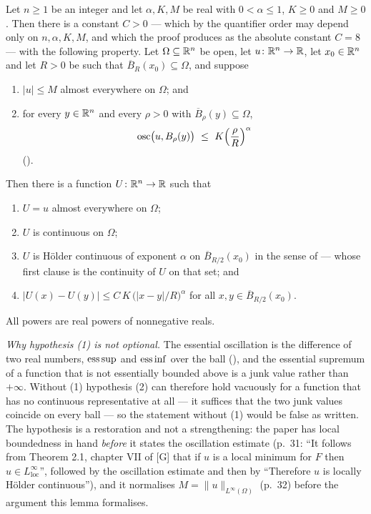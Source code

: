 \begin{lemma}
Let $n\ge1$ be an integer and let $\alpha,K,M$ be real with
$0<\alpha\le1$, $K\ge0$ and $M\ge0$.  Then there is a constant $C>0$ --- which
by the quantifier order may depend only on $n,\alpha,K,M$, and which the proof
produces as the absolute constant $C=8$ --- with the following property.  Let
$\Omega\subseteq\mathbb{R}^n$ be open, let $u\colon\mathbb{R}^n\to\mathbb{R}$, let $x_0\in\mathbb{R}^n$ and let
$R>0$ be such that $\overline B_R(x_0)\subseteq\Omega$, and suppose
\begin{enumerate}
\item $|u|\le M$ almost everywhere on $\Omega$; and
\item for every $y\in\mathbb{R}^n$ and every $\rho>0$ with
  $\overline B_\rho(y)\subseteq\Omega$,
  \[
  \operatorname*{osc}\bigl(u,B_\rho(y)\bigr)\ \le\ K\Bigl(\frac\rho R\Bigr)^{\alpha}
  \]
  ().
\end{enumerate}
Then there is a function $U\colon\mathbb{R}^n\to\mathbb{R}$ such that
\begin{enumerate}
\item[(a)] $U=u$ almost everywhere on $\Omega$;
\item[(b)] $U$ is continuous on $\Omega$;
\item[(c)] $U$ is H\"older continuous of exponent $\alpha$ on
  $\overline B_{R/2}(x_0)$ in the sense of  --- whose first
  clause is the continuity of $U$ on that set; and
\item[(d)] $|U(x)-U(y)|\le C\,K\,\bigl(|x-y|/R\bigr)^{\alpha}$ for all
  $x,y\in\overline B_{R/2}(x_0)$.
\end{enumerate}
All powers are real powers of nonnegative reals.

\medskip
\emph{Why hypothesis (1) is not optional.}  The essential oscillation is the
difference of two real numbers, $\operatorname*{ess\,sup}$ and
$\operatorname*{ess\,inf}$ over the ball (), and the essential
supremum of a function that is not essentially bounded above is a junk value
rather than $+\infty$.  Without (1) hypothesis (2) can therefore hold vacuously
for a function that has no continuous representative at all --- it suffices that
the two junk values coincide on every ball --- so the statement without (1)
would be false as written.  The hypothesis is a restoration and not a
strengthening: the paper has local boundedness in hand \emph{before} it states
the oscillation estimate (p.~31: ``It follows from Theorem 2.1, chapter VII of
[G] that if $u$ is a local minimum for $F$ then $u\in L^\infty_{\mathrm{loc}}$'',
followed by the oscillation estimate and then by ``Therefore $u$ is locally
H\"older continuous''), and it normalises $M=\|u\|_{L^\infty(\Omega)}$ (p.~32)
before the argument this lemma formalises.


\end{lemma}
